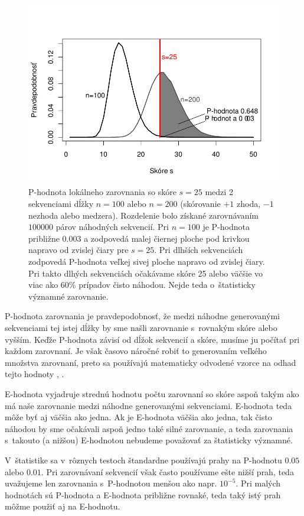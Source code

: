 \begin{figure}[htp]
    \centering
    \includegraphics[width=.9\textwidth]{images/p-value}
    \caption[P-hodnota lokálneho zarovnania]{P-hodnota lokálneho zarovnania so skóre $s = 25$ medzi 2 sekvenciami dĺžky $n = 100$ alebo $n = 200$ (skórovanie $+1$ zhoda, $-1$ nezhoda alebo medzera). Rozdelenie bolo získané zarovnávaním $100000$ párov náhodných sekvencií. Pri $n=100$ je P-hodnota približne 0.003 a zodpovedá malej čiernej ploche pod krivkou napravo od zvislej čiary pre $s=25$. Pri dlhších sekvenciách zodpovedá P-hodnota veľkej sivej ploche napravo od zvislej čiary. Pri takto dlhých sekvenciách očakávame skóre 25 alebo väčšie vo viac ako 60\% prípadov čisto náhodou. Nejde teda o~štatisticky významné zarovnanie.}
    \label{fig:p-value}
\end{figure}

P-hodnota zarovnania je pravdepodobnosť, že medzi náhodne generovanými sekvenciami tej istej dĺžky by sme našli zarovnanie s~rovnakým skóre alebo vyšším. Keďže P-hodnota závisí od dĺžok sekvencií a skóre, musíme ju počítať pri každom zarovnaní. Je však časovo náročné robiť to generovaním veľkého množstva zarovnaní, preto sa používajú matematicky odvodené vzorce na odhad tejto hodnoty \cite{Karlin}, \cite{Mitrophanov}.

E-hodnota vyjadruje strednú hodnotu počtu zarovnaní so skóre aspoň takým ako má naše zarovnanie medzi náhodne generovanými sekvenciami. E-hodnota teda môže byť aj väčšia ako jedna. Ak je E-hodnota väčšia ako jedna, tak čisto náhodou by sme očakávali aspoň jedno také silné zarovnanie, a teda zarovnania s~takouto (a nižšou) E-hodnotou nebudeme považovať za štatisticky významné.

V~štatistike sa v~rôznych testoch štandardne používajú prahy na P-hodnotu $0.05$ alebo $0.01$.
Pri zarovnávaní sekvencií však často používame ešte nižší prah, teda uvažujeme len zarovnania s~P-hodnotou menšou ako napr. $10^{-5}$. Pri malých hodnotách sú P-hodnota a E-hodnota približne rovnaké, teda taký istý prah môžme použiť aj na E-hodnotu.


